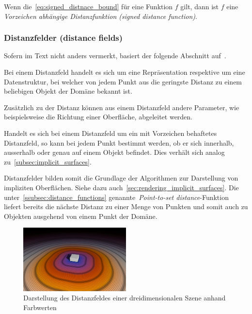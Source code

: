 Wenn die~\autoref{eq:signed_distnace_bound} für eine Funktion $f$
gilt, dann ist $f$ eine \textit{Vorzeichen abhängige Distanzfunktion
    (signed distance function)}.

\subsubsection{Distanzfelder (distance fields)}
\label{ssubsec:distance_fields}

Sofern im Text nicht anders vermerkt, basiert der folgende Abschnitt
auf~\cite{jones_3d_2006}.

Bei einem Distanzfeld handelt es sich um eine Repräsentation respektive
um eine Datenstruktur, bei welcher von jedem Punkt aus die geringste
Distanz zu einem beliebigen Objekt der Domäne bekannt ist.

Zusätzlich zu der Distanz können aus einem Distanzfeld andere Parameter,
wie beispielsweise die Richtung einer Oberfläche, abgeleitet werden.

Handelt es sich bei einem Distanzfeld um ein mit Vorzeichen behaftetes
Distanzfeld, so kann bei jedem Punkt bestimmt werden, ob er sich
innerhalb, ausserhalb oder genau auf einem Objekt befindet. Dies verhält
sich analog zu~\autoref{subsec:implicit_surfaces}.

Distanzfelder bilden somit die Grundlage der Algorithmen zur Darstellung
von impliziten Oberflächen. Siehe dazu
auch~\autoref{sec:rendering_implicit_surfaces}. Die
unter~\autoref{ssubsec:distance_functions} genannte~\textit{Point-to-set
    distance}-Funktion  liefert bereits die nächste Distanz zu einer
Menge von Punkten und somit auch zu Objekten ausgehend von einem Punkt
der Domäne.

\begin{figure}[H]
    \centering
    \includegraphics[width=0.5\textwidth]{img/distance_field.pdf}
    \caption{Darstellung des Distanzfeldes einer dreidimensionalen
        Szene anhand Farbwerten\protect\footnotemark}\label{
        fig:distance_field_illustration}
\end{figure}
